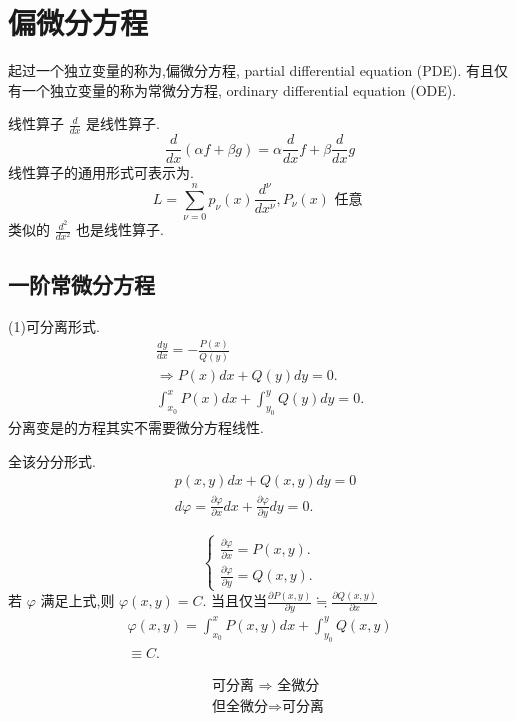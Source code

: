 \chapter{偏微分方程}
起过一个独立变量的称为,偏微分方程, partial differential equation (PDE). 有且仅有一个独立变量的称为常微分方程, 
ordinary differential equation (ODE).

线性算子
$\frac{d}{d x}$ 是线性算子.
$$
\frac{d}{d x}(\alpha f+\beta g)=\alpha \frac{d}{d x} f +\beta \frac{d}{d x} g
$$
线性算子的通用形式可表示为.
$$
L=\sum_{\nu=0}^n p_\nu(x) \frac{d^\nu}{d x^\nu}, P_\nu(x) \text { 任意 }
$$
类似的 $\frac{d^2}{d x^2}$ 也是线性算子.
\section{一阶常微分方程}

(1)可分离形式.
$$
\begin{gathered}
\frac{d y}{d x}=-\frac{P(x)}{Q(y)} \\
\Rightarrow P(x) d x+Q(y) d y=0 . \\
\int_{x_0}^x P(x) d x+\int_{y_0}^y Q(y) d y=0 .
\end{gathered}
$$
分离变是的方程其实不需要微分方程线性.

全该分分形式.
$$
\begin{aligned}
& p(x, y) d x+Q(x, y) d y=0 \\
& d \varphi=\frac{\partial \varphi}{\partial x} d x+\frac{\partial \varphi}{\partial y} d y=0 .
\end{aligned}
$$

$$
\left\{\begin{array}{l}
\frac{\partial \varphi}{\partial x}=P(x, y) . \\
\frac{\partial \varphi}{\partial y}=Q(x, y) .
\end{array}\right.
$$
若 $\varphi$ 满足上式,则 $\varphi(x, y)=C$.
当且仅当$\frac{\partial P(x, y)}{\partial y} \fallingdotseq \frac{\partial Q(x, y)}{\partial x}$
$$
\begin{gathered}
\varphi(x, y)=\int_{x_0}^x P(x, y) d x+\int_{y_0}^y Q(x, y) \\
\equiv C .
\end{gathered}
$$

$$
\begin{aligned}
    & \text { 可分离 } \Rightarrow \text { 全微分 } \\
    & \text { 但全微分} \Rightarrow \text{可分离} \\
\end{aligned}
$$

